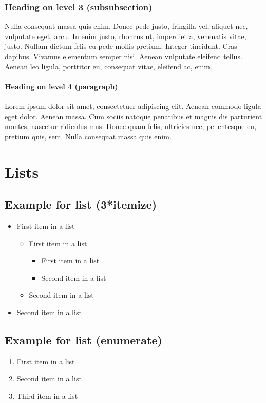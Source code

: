 \documentclass[paper=a4, fontsize=11pt]{scrartcl}
\numberwithin{equation}{section}		%
\numberwithin{figure}{section}			%
\numberwithin{table}{section}				%
\begin{document}
\begin{enumerate}
\subsubsection{Heading on level 3 (subsubsection)}
Nulla consequat massa quis enim. Donec pede justo, fringilla vel, aliquet nec, vulputate eget, arcu. In enim justo, rhoncus ut, imperdiet a, venenatis vitae, justo. Nullam dictum felis eu pede mollis pretium. Integer tincidunt. Cras dapibus. Vivamus elementum semper nisi. Aenean vulputate eleifend tellus. Aenean leo ligula, porttitor eu, consequat vitae, eleifend ac, enim.

\paragraph{Heading on level 4 (paragraph)}
Lorem ipsum dolor sit amet, consectetuer adipiscing elit. Aenean commodo ligula eget dolor. Aenean massa. Cum sociis natoque penatibus et magnis dis parturient montes, nascetur ridiculus mus. Donec quam felis, ultricies nec, pellentesque eu, pretium quis, sem. Nulla consequat massa quis enim. 


\section{Lists}

\subsection{Example for list (3*itemize)}
\begin{itemize}
	\item First item in a list 
		\begin{itemize}
		\item First item in a list 
			\begin{itemize}
			\item First item in a list 
			\item Second item in a list 
			\end{itemize}
		\item Second item in a list 
		\end{itemize}
	\item Second item in a list 
\end{itemize}

\subsection{Example for list (enumerate)}
\begin{enumerate}
	\item First item in a list 
	\item Second item in a list 
	\item Third item in a list
\end{enumerate}


\end{enumerate}
\end{document}
